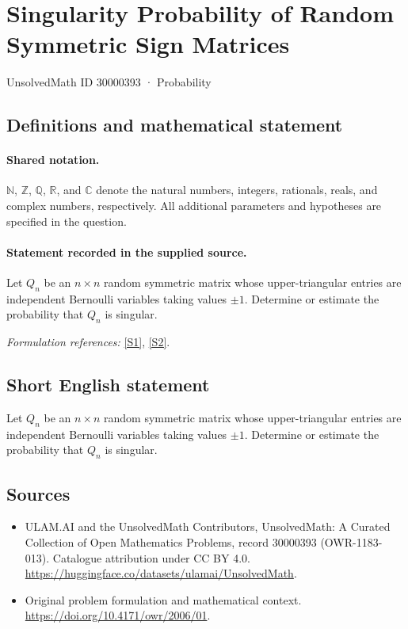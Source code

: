\documentclass[11pt]{article}
\newcommand{\sref}[2]{\hyperlink{source:#1:#2}{[S#2]}}
\begin{document}
\setcounter{section}{30000392}
\section{Singularity Probability of Random Symmetric Sign Matrices}\label{30000393}
{\small UnsolvedMath ID 30000393 · Probability}
\subsection{Definitions and mathematical statement}

\paragraph{Shared notation.}$\mathbb N$, $\mathbb Z$, $\mathbb Q$, $\mathbb R$, and $\mathbb C$ denote the natural numbers, integers, rationals, reals, and complex numbers, respectively. All additional parameters and hypotheses are specified in the question.


\paragraph{Statement recorded in the supplied source.}
Let $Q_n$ be an $n\times n$ random symmetric matrix whose upper-triangular entries are independent Bernoulli variables taking values $\pm1$. Determine or estimate the probability that $Q_n$ is singular.
\par\smallskip\textit{Formulation references:} \sref{30000393}{1}, \sref{30000393}{2}.
\subsection{Short English statement}
Let $Q_n$ be an $n\times n$ random symmetric matrix whose upper-triangular entries are independent Bernoulli variables taking values $\pm1$. Determine or estimate the probability that $Q_n$ is singular.
\subsection{Sources}
\begin{itemize}
\item[\hypertarget{source:30000393:1}{S1}] ULAM.AI and the UnsolvedMath Contributors, UnsolvedMath: A Curated Collection of Open Mathematics Problems, record 30000393 (OWR-1183-013). Catalogue attribution under CC BY 4.0.
\url{https://huggingface.co/datasets/ulamai/UnsolvedMath}.
\item[\hypertarget{source:30000393:2}{S2}] Original problem formulation and mathematical context.
\url{https://doi.org/10.4171/owr/2006/01}.
\end{itemize}
\label{end:30000393}
\end{document}
